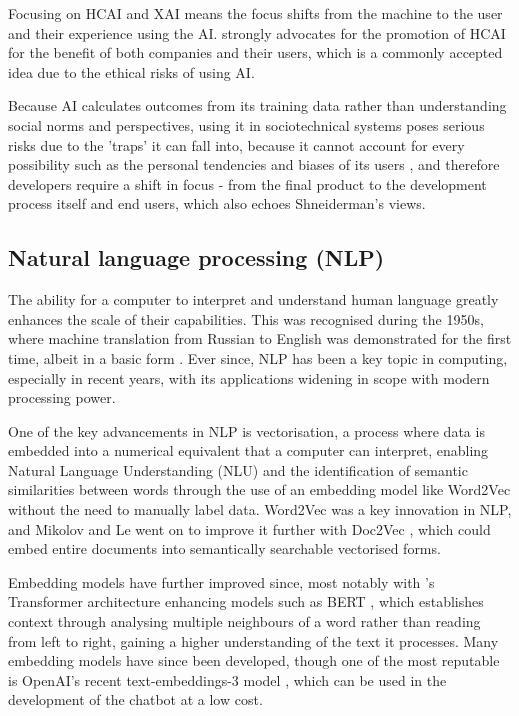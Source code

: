 \documentclass[12pt]{report}
\begin{document}
    Focusing on HCAI and XAI means the focus shifts from the machine to the user and their experience 
    using the AI. \textcite{AIEthics} strongly advocates for the 
    promotion of HCAI for the benefit of both companies and their users, which is a commonly accepted 
    idea due to the ethical risks of using AI. 
    
    Because AI calculates outcomes from its training data rather 
    than understanding social norms and perspectives, using it in sociotechnical systems poses serious risks 
    due to the 'traps' it can fall into, because it cannot account for every possibility such as the personal tendencies 
    and biases of its users \autocite{selbst_fairness_2019}, and therefore developers require a shift in focus - from the final product
    to the development process itself and end users, which also echoes Shneiderman's views. 

    \subsection{Natural language processing (NLP)}
    The ability for a computer to interpret and understand human language greatly enhances the scale of their capabilities. This was 
    recognised during the 1950s, where machine translation from Russian to English was demonstrated for the first time, albeit in a basic form \autocite{zampolli_natural_1994}.
    Ever since, NLP has been a key topic in computing, especially in recent years, with its applications widening 
    in scope with modern processing power.

    One of the key advancements in NLP is vectorisation, a process where data is embedded into a numerical equivalent that a computer can interpret, 
    enabling Natural Language Understanding (NLU) and the identification of semantic similarities between words through the use of an embedding model 
    like Word2Vec \autocite{mikolov_efficient_2013} without the need to manually label data. 
    Word2Vec was a key innovation in NLP, and Mikolov and Le went on to improve it further with Doc2Vec \autocite{le_distributed_2014}, which could embed 
    entire documents into semantically searchable vectorised forms.
    
    Embedding models have further improved since, most notably with \textcite{vaswani_attention_2017}'s Transformer architecture enhancing models such as 
    BERT \autocite{devlin_bert_2019}, which establishes context through analysing multiple neighbours of a word rather than reading from left to right,
    gaining a higher understanding of the text it processes. Many embedding models have since been developed, though one of the most reputable is OpenAI's 
    recent text-embeddings-3 model \autocite{openai_vector_nodate}, which can be used in the development of the chatbot at a low cost. 
\end{document}
